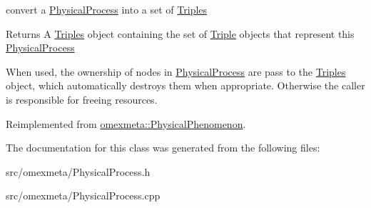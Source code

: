 convert a \hyperlink{classomexmeta_1_1PhysicalProcess}{Physical\+Process} into a set of \hyperlink{classomexmeta_1_1Triples}{Triples} 

\begin{DoxyReturn}{Returns}
A \hyperlink{classomexmeta_1_1Triples}{Triples} object containing the set of \hyperlink{classomexmeta_1_1Triple}{Triple} objects that represent this \hyperlink{classomexmeta_1_1PhysicalProcess}{Physical\+Process}
\end{DoxyReturn}
When used, the ownership of nodes in \hyperlink{classomexmeta_1_1PhysicalProcess}{Physical\+Process} are pass to the \hyperlink{classomexmeta_1_1Triples}{Triples} object, which automatically destroys them when appropriate. Otherwise the caller is responsible for freeing resources. 

Reimplemented from \hyperlink{classomexmeta_1_1PhysicalPhenomenon_a30617e685bd8b155a76d38ab5a9db273}{omexmeta\+::\+Physical\+Phenomenon}.



The documentation for this class was generated from the following files\+:\begin{DoxyCompactItemize}
\item 
src/omexmeta/Physical\+Process.\+h\item 
src/omexmeta/Physical\+Process.\+cpp\end{DoxyCompactItemize}
